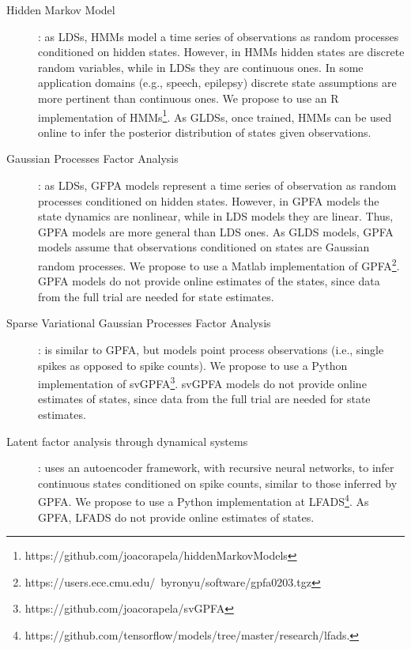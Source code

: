 \begin{description}
    \item[Hidden Markov Model]\citep[HMM;][]{rabiner89}: as LDSs, HMMs model a
        time series of observations as random processes conditioned on hidden
        states. However, in HMMs hidden states are discrete random variables,
        while in LDSs they are continuous ones. In some application domains
        (e.g., speech, epilepsy) discrete state assumptions are more pertinent
        than continuous ones. We propose to use an R implementation of
        HMMs\footnote{https://github.com/joacorapela/hiddenMarkovModels}.
        As GLDSs, once trained, HMMs can be used online to infer the posterior
        distribution of states given observations.

    \item[Gaussian Processes Factor Analysis]\citep[GPFA;][]{yuEtAl09}: as
        LDSs, GFPA models represent a time series of observation as random
        processes conditioned on hidden states. However, in GPFA models the
        state dynamics are nonlinear, while in LDS models they are linear.
        Thus, GPFA models are more general than LDS ones. As GLDS models, GPFA
        models assume that observations conditioned on states are Gaussian
        random processes. We propose to use a Matlab implementation of
        GPFA\footnote{https://users.ece.cmu.edu/~byronyu/software/gpfa0203.tgz}.
        GPFA models do not provide online estimates of the states, since data
        from the full trial are needed for state estimates.

    \item[Sparse Variational Gaussian Processes Factor
        Analysis]\citep[svGPFA;][]{dunckerAndSahani18}: is similar to GPFA, but
        models point process observations (i.e., single spikes as opposed to
        spike counts). We propose to use a Python implementation of
        svGPFA\footnote{https://github.com/joacorapela/svGPFA}.
        svGPFA models do not provide online estimates of states, since data
        from the full trial are needed for state estimates.

    \item[Latent factor analysis through dynamical
        systems]\citep[LFADS;][]{pandarinathEtAl18}: uses an autoencoder
        framework, with recursive neural networks, to infer continuous states
        conditioned on spike counts, similar to those inferred by GPFA. We
        propose to use a Python implementation at
        LFADS\footnote{https://github.com/tensorflow/models/tree/master/research/lfads.}.
        As GPFA, LFADS do not provide online estimates of states.

\end{description}

